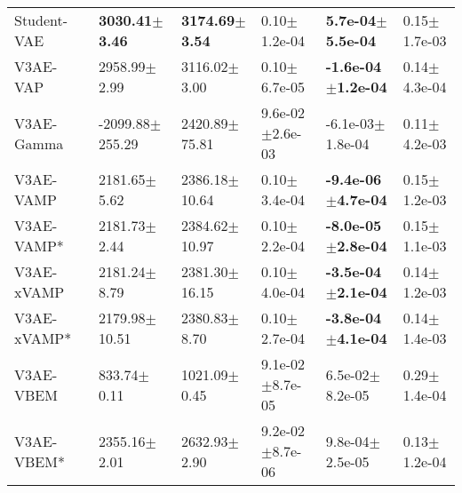 \begin{tabular}{llllll}
Student-VAE            &  \textbf{3030.41$\pm$3.46} &  \textbf{3174.69$\pm$3.54} &              0.10$\pm$1.2e-04 &   \textbf{5.7e-04$\pm$5.5e-04} &              0.15$\pm$1.7e-03 \\
V3AE-VAP               &           2958.99$\pm$2.99 &           3116.02$\pm$3.00 &              0.10$\pm$6.7e-05 &  \textbf{-1.6e-04$\pm$1.2e-04} &              0.14$\pm$4.3e-04 \\
V3AE-Gamma             &        -2099.88$\pm$255.29 &          2420.89$\pm$75.81 &           9.6e-02$\pm$2.6e-03 &           -6.1e-03$\pm$1.8e-04 &              0.11$\pm$4.2e-03 \\
V3AE-VAMP              &           2181.65$\pm$5.62 &          2386.18$\pm$10.64 &              0.10$\pm$3.4e-04 &  \textbf{-9.4e-06$\pm$4.7e-04} &              0.15$\pm$1.2e-03 \\
V3AE-VAMP*             &           2181.73$\pm$2.44 &          2384.62$\pm$10.97 &              0.10$\pm$2.2e-04 &  \textbf{-8.0e-05$\pm$2.8e-04} &              0.15$\pm$1.1e-03 \\
V3AE-xVAMP             &           2181.24$\pm$8.79 &          2381.30$\pm$16.15 &              0.10$\pm$4.0e-04 &  \textbf{-3.5e-04$\pm$2.1e-04} &              0.14$\pm$1.2e-03 \\
V3AE-xVAMP*            &          2179.98$\pm$10.51 &           2380.83$\pm$8.70 &              0.10$\pm$2.7e-04 &  \textbf{-3.8e-04$\pm$4.1e-04} &              0.14$\pm$1.4e-03 \\
V3AE-VBEM              &            833.74$\pm$0.11 &           1021.09$\pm$0.45 &           9.1e-02$\pm$8.7e-05 &            6.5e-02$\pm$8.2e-05 &              0.29$\pm$1.4e-04 \\
V3AE-VBEM*             &           2355.16$\pm$2.01 &           2632.93$\pm$2.90 &           9.2e-02$\pm$8.7e-06 &            9.8e-04$\pm$2.5e-05 &              0.13$\pm$1.2e-04 \\
\bottomrule
\end{tabular}

